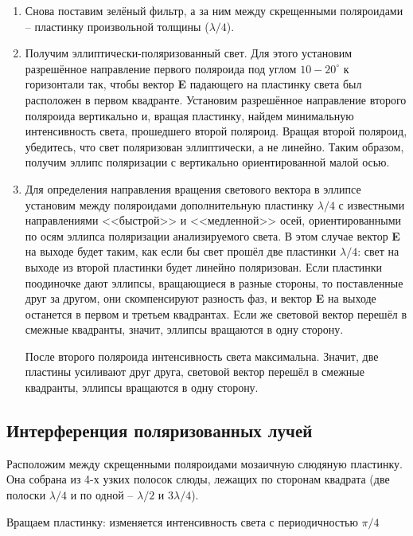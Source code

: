 	\begin{enumerate}
		\item  Снова поставим зелёный фильтр, а за ним между скрещенными поляроидами -- пластинку произвольной толщины ($\lambda/4$).
		
		\item Получим эллиптически-поляризованный свет. Для этого установим разрешённое направление первого поляроида под углом $10-20^{\circ}$ к горизонтали так, чтобы вектор \textbf{E} падающего на пластинку света был расположен в первом квадранте.
		Установим разрешённое направление второго поляроида вертикально и, вращая пластинку, найдем минимальную
		интенсивность света, прошедшего второй поляроид. Вращая второй поляроид, убедитесь, что свет поляризован эллиптически,
		а не линейно.
		Таким образом, получим эллипс поляризации с вертикально ориентированной малой осью.
		\item  Для определения направления вращения светового вектора в эллипсе
		установим между поляроидами дополнительную пластинку $\lambda/4$ с известными направлениями <<быстрой>> и <<медленной>> осей, ориентированными по осям эллипса поляризации анализируемого света.
		В этом случае вектор \textbf{E} на выходе будет таким, как если бы свет прошёл две пластинки $\lambda/4$: свет на выходе из второй пластинки будет линейно поляризован. Если пластинки поодиночке дают эллипсы, вращающиеся в разные стороны, то поставленные друг за другом, они скомпенсируют
		разность фаз, и вектор \textbf{E} на выходе останется в первом
		и третьем квадрантах. Если же световой вектор перешёл в смежные квадранты, значит, эллипсы вращаются в одну сторону. 
		
		После второго поляроида интенсивность света максимальна. Значит, две пластины усиливают друг друга, световой вектор перешёл в смежные квадранты, эллипсы вращаются в одну сторону.
		
	\end{enumerate}
	
	\subsection*{Интерференция поляризованных лучей}
	
	Расположим между скрещенными поляроидами мозаичную слюдяную пластинку. Она собрана из 4-х узких полосок слюды, лежащих по сторонам квадрата (две полоски $\lambda/4$ и по одной -- $\lambda/2$ и $3\lambda/4$).
	 
	Вращаем пластинку: изменяется интенсивность света с периодичностью $\pi/4$
	
